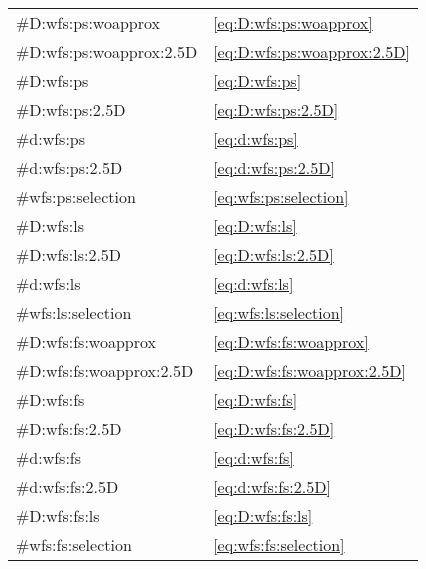 \begin{tabular}{ll}
    \#D:wfs:ps:woapprox       & \eqref{eq:D:wfs:ps:woapprox} \\
    \#D:wfs:ps:woapprox:2.5D  & \eqref{eq:D:wfs:ps:woapprox:2.5D} \\
    \#D:wfs:ps                & \eqref{eq:D:wfs:ps} \\
    \#D:wfs:ps:2.5D           & \eqref{eq:D:wfs:ps:2.5D} \\
    \#d:wfs:ps                & \eqref{eq:d:wfs:ps} \\
    \#d:wfs:ps:2.5D           & \eqref{eq:d:wfs:ps:2.5D} \\
    \#wfs:ps:selection        & \eqref{eq:wfs:ps:selection} \\
    \#D:wfs:ls                & \eqref{eq:D:wfs:ls} \\
    \#D:wfs:ls:2.5D           & \eqref{eq:D:wfs:ls:2.5D} \\
    \#d:wfs:ls                & \eqref{eq:d:wfs:ls} \\
    \#wfs:ls:selection        & \eqref{eq:wfs:ls:selection} \\
    \#D:wfs:fs:woapprox       & \eqref{eq:D:wfs:fs:woapprox} \\
    \#D:wfs:fs:woapprox:2.5D  & \eqref{eq:D:wfs:fs:woapprox:2.5D} \\
    \#D:wfs:fs                & \eqref{eq:D:wfs:fs} \\
    \#D:wfs:fs:2.5D           & \eqref{eq:D:wfs:fs:2.5D} \\
    \#d:wfs:fs                & \eqref{eq:d:wfs:fs} \\
    \#d:wfs:fs:2.5D           & \eqref{eq:d:wfs:fs:2.5D} \\
    \#D:wfs:fs:ls             & \eqref{eq:D:wfs:fs:ls} \\
    \#wfs:fs:selection        & \eqref{eq:wfs:fs:selection} \\
\end{tabular}
